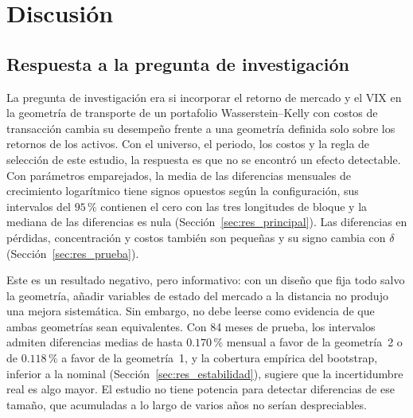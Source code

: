 
\section{Discusión}\label{sec:discusion}

\subsection{Respuesta a la pregunta de investigación}\label{sec:disc_respuesta}

La pregunta de investigación era si incorporar el retorno de mercado y el VIX en la geometría de transporte de un portafolio Wasserstein--Kelly con costos de transacción cambia su desempeño frente a una geometría definida solo sobre los retornos de los activos. Con el universo, el periodo, los costos y la regla de selección de este estudio, la respuesta es que no se encontró un efecto detectable. Con parámetros emparejados, la media de las diferencias mensuales de crecimiento logarítmico tiene signos opuestos según la configuración, sus intervalos del $95\,\%$ contienen el cero con las tres longitudes de bloque y la mediana de las diferencias es nula (Sección~\ref{sec:res_principal}). Las diferencias en pérdidas, concentración y costos también son pequeñas y su signo cambia con $\delta$ (Sección~\ref{sec:res_prueba}).

Este es un resultado negativo, pero informativo: con un diseño que fija todo salvo la geometría, añadir variables de estado del mercado a la distancia no produjo una mejora sistemática. Sin embargo, no debe leerse como evidencia de que ambas geometrías sean equivalentes. Con 84 meses de prueba, los intervalos admiten diferencias medias de hasta $0.170\,\%$ mensual a favor de la geometría~2 o de $0.118\,\%$ a favor de la geometría~1, y la cobertura empírica del bootstrap, inferior a la nominal (Sección~\ref{sec:res_estabilidad}), sugiere que la incertidumbre real es algo mayor. El estudio no tiene potencia para detectar diferencias de ese tamaño, que acumuladas a lo largo de varios años no serían despreciables.


